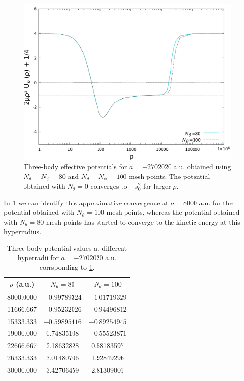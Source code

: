 \begin{figure}
	\includegraphics[width=\linewidth]{diffdiff.pdf}
	\caption{Three-body effective potentials for $a=-2702020$ a.u. obtained using $N_{\theta}=N_{\phi}=80$ and $N_{\theta}=N_{\phi}=100$ mesh points. The potential obtained with $N_{\theta}=0$ converges to $-s_0^2$ for larger $\rho$.}
	\label{fig:res_4}
\end{figure}
In \cref{table:Res_1} we can identify this approximative convergence at $\rho=8000$ a.u. for the potential obtained with $N_{\theta}=100$ mesh points, whereas the potential obtained with $N_{\theta}=80$ mesh points has started to converge to the kinetic energy at this hyperradius.  

\begin{table}[h!]
	\centering
	\begin{tabular}{||c c c||} 
		\hline
		$\rho$ (a.u.) & $N_{\theta}=80$ & $N_{\theta}=100$  \\ [0.5ex] 
		\hline\hline
		8000.0000   & $-0.99789324$     & $-1.01719329$  \\ 
		11666.667	 & $-0.95232026$   & $-0.94496812$  \\
		15333.333   & $-0.59895416$  & $-0.89254945$  \\
		19000.000   & 0.74835108  & $-0.55523871$   \\
		22666.667   & 2.18632828  & 0.58183597   \\
		26333.333   & 3.01480706  & 1.92849296  \\  
		30000.000   & 3.42706459 & 2.81309001  \\ [1ex] 
		\hline
	\end{tabular}
	\caption{Three-body potential values at different hyperradii for $a = -2702020$ a.u. corrsponding to \cref{fig:res_4}.}
	\label{table:Res_1}
\end{table} 

